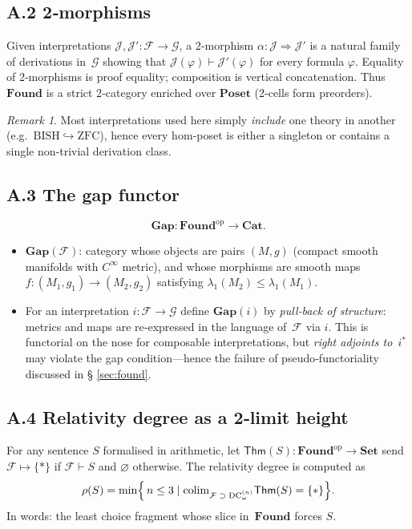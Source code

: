 \documentclass[11pt]{article}
\theoremstyle{definition}\newtheorem{definition}[theorem]{Definition}
\theoremstyle{remark}\newtheorem{remark}[theorem]{Remark}
\newcommand{\Found}{\mathbf{Found}}
\newcommand{\Gap}{\mathbf{Gap}}
\newcommand{\DCw}{\mathrm{DC}_{\omega}}
\begin{document}
\subsection*{A.2 2‑morphisms}
Given interpretations
\(\mathcal J,\mathcal J':\mathcal F\to\mathcal G\), a 2‑morphism
\(\alpha:\mathcal J\Rightarrow\mathcal J'\) is a natural family of
derivations in~\(\mathcal G\) showing that \(\mathcal J(\varphi)\vdash
\mathcal J'(\varphi)\) for every formula \(\varphi\).  Equality of
2‑morphisms is proof equality; composition is vertical concatenation.
Thus \(\Found\) is a strict 2‑category enriched over \(\mathbf{Poset}\)
(2‑cells form preorders).

\begin{remark}
Most interpretations used here simply \emph{include} one theory in
another (e.g.\ $\mathrm{BISH}\hookrightarrow\mathrm{ZFC}$), hence every
hom‑poset is either a singleton or contains a single non‑trivial
derivation class.
\end{remark}

\subsection*{A.3 The gap functor}
\[
  \Gap:\Found^{\mathrm{op}}\longrightarrow\mathbf{Cat}.
\]
\begin{itemize}[leftmargin=1.9em,itemsep=0.3em]
\item \(\Gap(\mathcal F)\): category whose objects are pairs
      \((M,g)\) (compact smooth manifolds with $C^\infty$ metric), and
      whose morphisms are smooth maps
      \(f:(M_1,g_1)\to(M_2,g_2)\) satisfying
      \( \lambda_1(M_2)\le\lambda_1(M_1)\).
\item For an interpretation
      \(i:\mathcal F\to\mathcal G\)
      define \(\Gap(i)\) by \emph{pull‑back of structure}:
      metrics and maps are re‑expressed in the language of~\(\mathcal F\)
      via \(i\).  This is functorial on the nose for composable
      interpretations, but \emph{right adjoints to~\(i^\ast\)} may
      violate the gap condition—hence the failure of pseudo‑functoriality
      discussed in § \ref{sec:found}.
\end{itemize}

\subsection*{A.4 Relativity degree as a 2‑limit height}
For any sentence \(S\) formalised in arithmetic, let
\(\mathsf{Thm}(S):\Found^{\mathrm{op}}\to\mathbf{Set}\) send
\(\mathcal F\mapsto\{\ast\}\) if \(\mathcal F\vdash S\) and
\(\varnothing\) otherwise.  The relativity degree is computed as
\[
\rho(S)=\min\Bigl\{\,n\le3 \mid
  \mathrm{colim}_{\mathcal F\;\supset\;\DCw^{(n)}} \mathsf{Thm}(S)=\{\ast\}
\Bigr\}.
\]
In words: the least choice fragment whose slice in~\(\Found\) forces \(S\).
\end{document}
